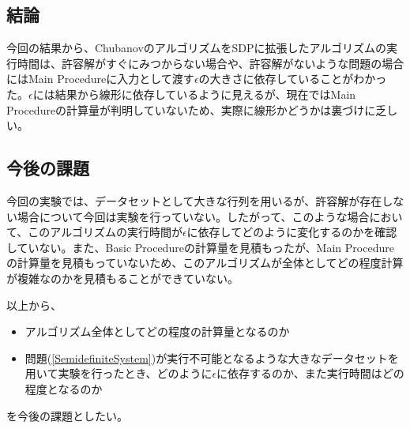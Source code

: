 \subsection{結論}
今回の結果から、ChubanovのアルゴリズムをSDPに拡張したアルゴリズムの実行時間は、許容解がすぐにみつからない場合や、許容解がないような問題の場合にはMain Procedureに入力として渡す$\epsilon$の大きさに依存していることがわかった。$\epsilon$には結果から線形に依存しているように見えるが、現在ではMain Procedureの計算量が判明していないため、実際に線形かどうかは裏づけに乏しい。

\subsection{今後の課題}
今回の実験では、データセットとして大きな行列を用いるが、許容解が存在しない場合について今回は実験を行っていない。したがって、このような場合において、このアルゴリズムの実行時間が$\epsilon$に依存してどのように変化するのかを確認していない。また、Basic Procedureの計算量を見積もったが、Main Procedureの計算量を見積もっていないため、このアルゴリズムが全体としてどの程度計算が複雑なのかを見積もることができていない。

以上から、
\begin{itemize}
  \item アルゴリズム全体としてどの程度の計算量となるのか
  \item 問題(\ref{SemidefiniteSystem})が実行不可能となるような大きなデータセットを用いて実験を行ったとき、どのように$\epsilon$に依存するのか、また実行時間はどの程度となるのか
\end{itemize}
を今後の課題としたい。
